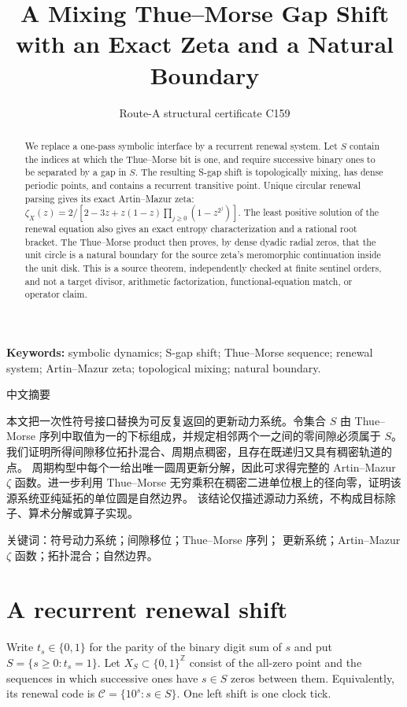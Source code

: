 \documentclass[10pt]{article}
\title{A Mixing Thue--Morse Gap Shift with an Exact Zeta and a Natural Boundary}
\author{Route-A structural certificate C159}
\date{}
\begin{document}
\maketitle
\begin{abstract}
We replace a one-pass symbolic interface by a recurrent renewal system.  Let
$S$ contain the indices at which the Thue--Morse bit is one, and require
successive binary ones to be separated by a gap in $S$.  The resulting
S-gap shift is topologically mixing, has dense periodic points, and contains
a recurrent transitive point.  Unique circular renewal parsing gives its
exact Artin--Mazur zeta:
$\zeta_X(z)=2/[2-3z+z(1-z)\prod_{j\geq0}(1-z^{2^j})]$.
The least positive solution of the renewal equation also gives an exact
entropy characterization and a rational root bracket.  The Thue--Morse
product then proves, by dense dyadic radial zeros, that the unit circle is a natural boundary for the source
zeta's meromorphic continuation inside the unit disk.  This is a source
theorem, independently checked at finite sentinel orders, and not a target
divisor, arithmetic factorization, functional-equation match, or operator
claim.
\end{abstract}
\noindent\textbf{Keywords:} symbolic dynamics; S-gap shift; Thue--Morse
sequence; renewal system; Artin--Mazur zeta; topological mixing; natural
boundary.

\begin{otherlanguage}{chinese-simplified}
\begin{center}{\large 中文摘要}\end{center}
\begin{sloppypar}
本文把一次性符号接口替换为可反复返回的更新动力系统。令集合 $S$ 由
\foreignlanguage{english}{Thue--Morse} 序列中取值为一的下标组成，并规定相邻两个一之间的零间隙必须属于 $S$。
我们证明所得间隙移位拓扑混合、周期点稠密，且存在既递归又具有稠密轨道的点。
周期构型中每个一给出唯一圆周更新分解，因此可求得完整的
\foreignlanguage{english}{Artin--Mazur} $\zeta$ 函数。进一步利用
\foreignlanguage{english}{Thue--Morse} 无穷乘积在稠密二进单位根上的径向零，证明该源系统亚纯延拓的单位圆是自然边界。
该结论仅描述源动力系统，不构成目标除子、算术分解或算子实现。
\end{sloppypar}
\noindent 关键词：符号动力系统；间隙移位；\foreignlanguage{english}{Thue--Morse} 序列；
更新系统；\foreignlanguage{english}{Artin--Mazur} $\zeta$ 函数；拓扑混合；自然边界。
\end{otherlanguage}

\section{A recurrent renewal shift}
Write $t_s\in\{0,1\}$ for the parity of the binary digit sum of $s$ and
put $S=\{s\geq0:t_s=1\}$.  Let $X_S\subset\{0,1\}^{\mathbb Z}$ consist of
the all-zero point and the sequences in which successive ones have $s\in S$
zeros between them.  Equivalently, its renewal code is
$\mathcal C=\{10^s:s\in S\}$.  One left shift is one clock tick.
\end{document}
